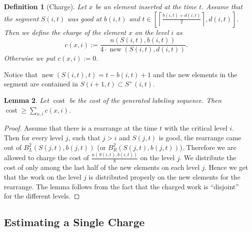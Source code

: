 \documentclass[11pt]{article} %
\newcommand{\charge}[2]{c(#1, #2)}
\newcommand{\new}[2]{\operatorname{new}(#1, #2)}
\newcommand{\scount}[2]{n(#1, #2)}
\newcommand{\segment}[2]{S(#1, #2)}
\newcommand{\segmentt}[2]{S^+(#1, #2)}
\newtheorem{definition}{Definition} %
\newtheorem{lemma}[definition]{Lemma}
\begin{document}
\begin{definition}[Charge]
Let $x$ be an element inserted at the time $t$.
Assume that the segment $\segment{i}{t}$ was good at $b(i, t)$ and  $t \in \left[\left\lceil \frac{b(i, t) + d(i, t)}{2}\right\rceil, d(i, t) \right]$.
Then we define the \emph{charge} of the element $x$ on the level $i$ as 
\[
	\charge{x}{i} := \frac{\scount{\segment{i}{t}}{b(i, t)}}{4 \cdot \new{\segment{i}{t}}{d(i, t)}}.
\]
Otherwise we put $\charge{x}{i} := 0$.
\end{definition}

Notice that $\new{\segment{i}{t}}{t} = t - b(i, t) + 1$ and the new elements in the segment are contained in $\segment{i + 1}{t} \subset \segmentt{i}{t}$.

\begin{lemma}
\label{lm:charges-disjoint}
Let $\operatorname{cost}$ be the cost of the generated labeling sequence. Then $\operatorname{cost} \geq \sum_{x, i} \charge{x}{i}$.
\end{lemma}
\begin{proof}
Assume that there is a rearrange at the time $t$ with the critical level $i$. Then for every level $j$, such that $j > i$ and $\segment{j}{t}$ is good, the rearrange came out of $B^2_L(\segment{j}{t}, b(j, t))$ (or $B^2_R(\segment{j}{t}, b(j, t))$).
Therefore we are allowed to charge the cost of $\frac{\scount{\segment{i}{t}}{b(i, t)}}{8}$ on the level $j$.
We distribute the cost of only among the last half of the new elements on each level $j$.
Hence we get that the work on the level $j$ is distributed properly on the new elements for the rearrange.
The lemma follows from the fact that the charged work is ``disjoint'' for the different levels.
\end{proof}

\subsection{Estimating a Single Charge}
\end{document}
